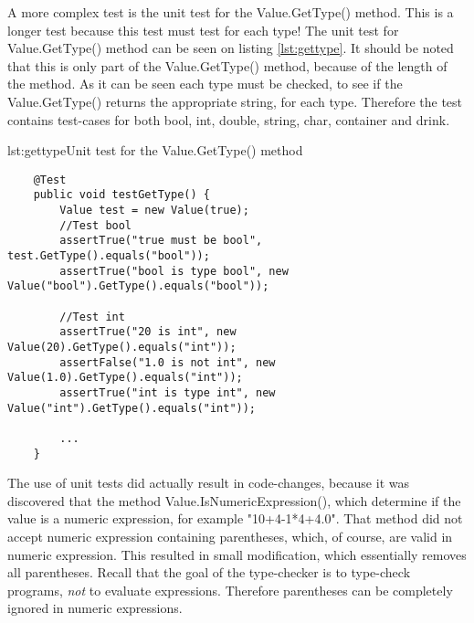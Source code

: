 
A more complex test is the unit test for the Value.GetType() method. This is a longer test because this test must test for each type! The unit test for Value.GetType() method can be seen on listing \ref{lst:gettype}. It should be noted that this is only part of the Value.GetType() method, because of the length of the method. As it can be seen each type must be checked, to see if the Value.GetType() returns the appropriate string, for each type. Therefore the test contains test-cases for both bool, int, double, string, char, container and drink. 

\begin{code}{lst:gettype}{Unit test for the Value.GetType() method}
\begin{lstlisting}
	@Test
	public void testGetType() {
	    Value test = new Value(true);
	    //Test bool
	    assertTrue("true must be bool", test.GetType().equals("bool"));
	    assertTrue("bool is type bool", new Value("bool").GetType().equals("bool"));
	    
	    //Test int
	    assertTrue("20 is int", new Value(20).GetType().equals("int"));
	    assertFalse("1.0 is not int", new Value(1.0).GetType().equals("int"));
	    assertTrue("int is type int", new Value("int").GetType().equals("int"));
	
		...    
	}
\end{lstlisting}
\end{code}

The use of unit tests did actually result in code-changes, because it was discovered that the method Value.IsNumericExpression(), which determine if the value is a numeric expression, for example "10+4-1*4+4.0". That method did not accept numeric expression containing parentheses, which, of course, are valid in numeric expression. This resulted in small modification, which essentially removes all parentheses. Recall that the goal of the type-checker is to type-check programs, \emph{not} to evaluate expressions. Therefore parentheses can be completely ignored in numeric expressions. 